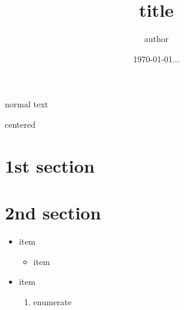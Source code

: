 \documentclass[12pt]{scrartcl}
\title{title}
\author{author}
\date{\today{}...}
\begin{document}
\maketitle
\tableofcontents 	%
\newpage	%
normal text
\begin{center}
centered
\end{center}
\section{1st section}	%
\section{2nd section} %
\label{sec:2nd-section} %

\begin{itemize} %
\item item
\begin{itemize}
\item item
\end{itemize}
\item item
\begin{enumerate}	%
\item enumerate
\end{enumerate}
\end{itemize}
\end{document}
